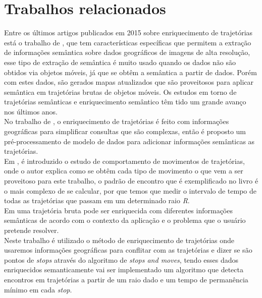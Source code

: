 \documentclass[	12pt, Times, openright, twoside, a4paper, english, brazil]{abntex2}
\begin{document}
          	

  \chapter{Trabalhos relacionados}
    Entre os últimos artigos publicados em 2015 sobre enriquecimento de trajetórias está o trabalho de \cite{sublime2015}, que tem características específicas que permitem a extração de informações semântica sobre dados geográficos de imagens de alta resolução, esse tipo de extração de semântica é muito usado quando os dados não são obtidos via objetos móveis, já que se obtêm a semântica a partir de dados. Porém com estes dados, são gerados mapas atualizados que são proveitosos para aplicar semântica em trajetórias brutas de objetos móveis. Os estudos em torno de trajetórias semânticas e enriquecimento semântico têm tido um grande avanço nos últimos anos.\\
    \indent No trabalho de \cite{alvares2007}, o enriquecimento de trajetórias é feito com informações geográficas para simplificar consultas que são complexas, então é proposto um pré-processamento de modelo de dados para adicionar informações semânticas as trajetórias.\\
    \indent Em \cite{laube2005finding}, é introduzido o estudo de comportamento de movimentos de trajetórias, onde o autor explica como se obtêm cada tipo de movimento o que vem a ser proveitoso para este trabalho, o padrão de encontro que é exemplificado no livro é o mais complexo de se calcular, por que temos que medir o intervalo de tempo de todas as trajetórias que passam em um determinado raio \textit{R}.\\
    \indent Em \cite{Bogorny2012} uma trajetória bruta pode ser enriquecida com diferentes informações semânticas de acordo com o contexto da aplicação e o problema que o usuário pretende resolver.\\
    \indent Neste trabalho é utilizado o método de enriquecimento de trajetórias onde usaremos informações geográficas para conflitar com as trajetórias e dizer se são pontos de \textit{stops} através do algoritmo de \textit{stops and moves}, tendo esses dados enriquecidos semanticamente vai ser implementado um algoritmo que detecta encontros em trajetórias a partir de um raio dado e um tempo de permanência mínimo em cada \textit{stop}.
  
\end{document}
